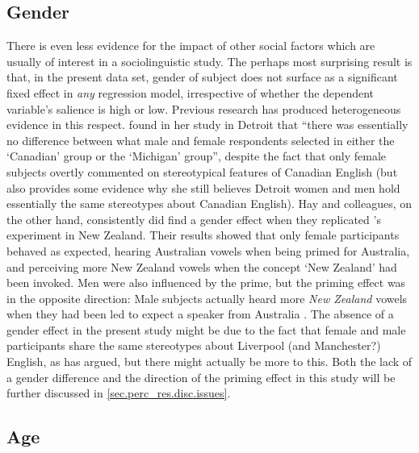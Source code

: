 		\subsection{Gender}

There is even less evidence for the impact of other social factors which are usually of interest in a sociolinguistic study.
The perhaps most surprising result is that, in the present data set, gender of subject does not surface as a significant fixed effect in \emph{any} regression model, irrespective of whether the dependent variable's salience is high or low.
Previous research has produced heterogeneous evidence in this respect.
\textcite[69 and 79--80]{niedzielski1999} found in her study in Detroit that ``there was essentially no difference between what male and female respondents selected in either the `Canadian' group or the `Michigan' group'', despite the fact that only female subjects overtly commented on stereotypical features of Canadian English (but \citeauthor{niedzielski1999} also provides some evidence why she still believes Detroit women and men hold essentially the same stereotypes about Canadian English).
Hay and colleagues, on the other hand, consistently did find a gender effect when they replicated \citeauthor{niedzielski1999}'s experiment in New Zealand.
Their results showed that only female participants behaved as expected, hearing Australian vowels when being primed for Australia, and perceiving more New Zealand vowels when the concept `New Zealand' had been invoked.
Men were also influenced by the prime, but the priming effect was in the opposite direction: Male subjects actually heard more \emph{New Zealand} vowels when they had been led to expect a speaker from Australia \parencite{hayetal2006a,haydrager2010}.
The absence of a gender effect in the present study might be due to the fact that female and male participants share the same stereotypes about Liverpool (and Manchester?) English, as \citeauthor{niedzielski1999} has argued, but there might actually be more to this.
Both the lack of a gender difference and the direction of the priming effect in this study will be further discussed in \ref{sec.perc_res.disc.issues}.

		\subsection{Age}

